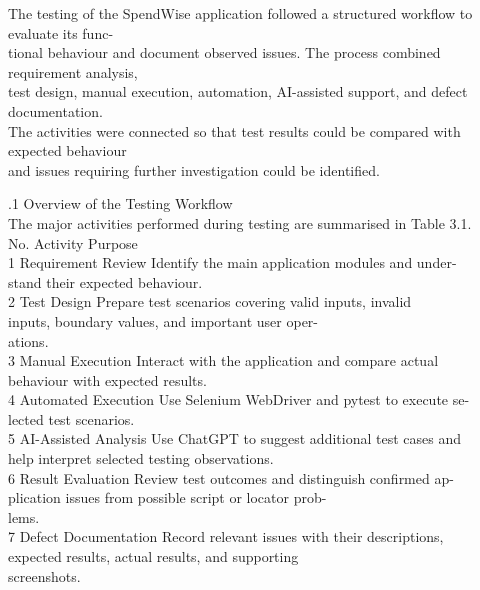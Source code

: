\documentclass[12pt,a4paper]{report}
\begin{document}
\smallskip
The testing of the SpendWise application followed a structured workflow to evaluate its func-\\ 
tional behaviour and document observed issues. The process combined requirement analysis,\\ 
test design, manual execution, automation, AI-assisted support, and defect documentation.\\ 
The activities were connected so that test results could be compared with expected behaviour\\ 
and issues requiring further investigation could be identified.\\ 

\smallskip

.1 Overview of the Testing Workflow\\ 

\smallskip
The major activities performed during testing are summarised in Table 3.1.\\ 

\smallskip
No.      Activity                   Purpose\\ 
1        Requirement Review         Identify the main application modules and under-\\ 
stand their expected behaviour.\\ 
2        Test Design                Prepare test scenarios covering valid inputs, invalid\\ 
inputs, boundary values, and important user oper-\\ 
ations.\\ 
3        Manual Execution           Interact with the application and compare actual\\ 
behaviour with expected results.\\ 
4        Automated Execution        Use Selenium WebDriver and pytest to execute se-\\ 
lected test scenarios.\\ 
5        AI-Assisted Analysis       Use ChatGPT to suggest additional test cases and\\ 
help interpret selected testing observations.\\ 
6        Result Evaluation          Review test outcomes and distinguish confirmed ap-\\ 
plication issues from possible script or locator prob-\\ 
lems.\\ 
7        Defect Documentation       Record relevant issues with their descriptions,\\ 
expected results, actual results, and supporting\\ 
screenshots.\\ 
\end{document}
